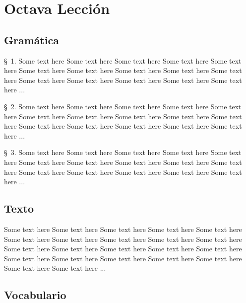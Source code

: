 
\chapter{Octava Lección} %

\label{ch:lesson08} %



\Large{\section*{Gramática}}

\S\ 1. Some text here Some text here Some text here Some text here Some text here Some text here Some text here Some text here Some text here Some text here Some text here Some text here Some text here Some text here Some text here ...

\S\ 2. Some text here Some text here Some text here Some text here Some text here Some text here Some text here Some text here Some text here Some text here Some text here Some text here Some text here Some text here Some text here ...

\S\ 3. Some text here Some text here Some text here Some text here Some text here Some text here Some text here Some text here Some text here Some text here Some text here Some text here Some text here Some text here Some text here ...

\Large{\section*{Texto}}

Some text here Some text here Some text here Some text here Some text here Some text here Some text here Some text here Some text here Some text here Some text here Some text here Some text here Some text here Some text here Some text here Some text here Some text here Some text here Some text here Some text here Some text here ...

\Large{\section*{Vocabulario}}


